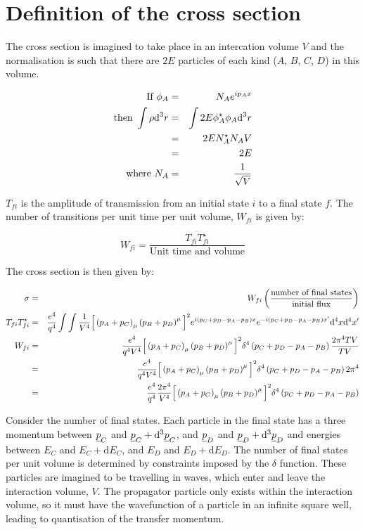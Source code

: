 \section{Definition of the cross section}

The cross section is imagined to take place in an intercation volume $V$ and the normalisation is such that there are $2E$ particles of each kind ($A$, $B$, $C$, $D$) in this volume.

\begin{eqnarray*}
  \textrm{If }\phi_A & = & N_Ae^{ip_Ax} \\
  \textrm{then }\int\rho\mathrm{d}^3r & = & \int 2E\phi^{\star}_A\phi_A\mathrm{d}^3r \\
  & = & 2EN^{\star}_AN_AV \\
  & = & 2E \\
  \textrm{where }N_A & = & \frac{1}{\sqrt{V}}
\end{eqnarray*}

$T_{fi}$ is the amplitude of transmission from an initial state $i$ to a final state $f$.  The number of transitions per unit time per unit volume, $W_{fi}$ is given by:

\[
  W_{fi} = \frac{T_{fi}T^{\star}_{fi}}{\textrm{Unit time and volume}}
\]

The cross section is then given by:

\begin{eqnarray*}
  \sigma & = & W_{fi}\left(\frac{\textrm{number of final states}}{\textrm{initial flux}}\right) \\
  T_{fi}T^{\star}_{fi} & = & \frac{e^4}{q^4}\int\int \frac{1}{V^4}\Big[\left(p_A+p_C\right)_{\mu}\left(p_B+p_D\right)^{\mu}\Big]^2 e^{i\left(p_C+p_D-p_A-p_B\right)x}e^{-i\left(p_C+p_D-p_A-p_B\right)x'}\mathrm{d}^4x\mathrm{d}^4x' \\
  W_{fi} & = & \frac{e^4}{q^4V^4}\Big[\left(p_A+p_C\right)_{\mu}\left(p_B+p_D\right)^{\mu}\Big]^2\delta^4\left(p_C+p_D-p_A-p_B\right)\frac{2\pi^4TV}{TV} \\
  & = & \frac{e^4}{q^4V^4}\Big[\left(p_A+p_C\right)_{\mu}\left(p_B+p_D\right)^{\mu}\Big]^2\delta^4\left(p_C+p_D-p_A-p_B\right)2\pi^4 \\
  & = & \frac{e^4}{q^4}\frac{2\pi^4}{V^4}\Big[\left(p_A+p_C\right)_{\mu}\left(p_B+p_D\right)^{\mu}\Big]^2\delta^4\left(p_C+p_D-p_A-p_B\right)
\end{eqnarray*}

Consider the number of final states.  Each particle in the final state has a three momentum between $\underline{p}_C$ and $\underline{p}_C + \mathrm{d}^3\underline{p}_C$, and $\underline{p}_D$ and $\underline{p}_D + \mathrm{d}^3\underline{p}_D$ and energies between $E_C$ and $E_C + \mathrm{d}E_C$, and $E_D$ and $E_D + \mathrm{d}E_D$.  The number of final states per unit volume is determined by constraints imposed by the $\delta$ function.  These particles are imagined to be travelling in waves, which enter and leave the interaction volume, $V$.  The propagator particle only exists within the interaction volume, so it must have the wavefunction of a particle in an infinite square well, leading to quantisation of the transfer momentum.

